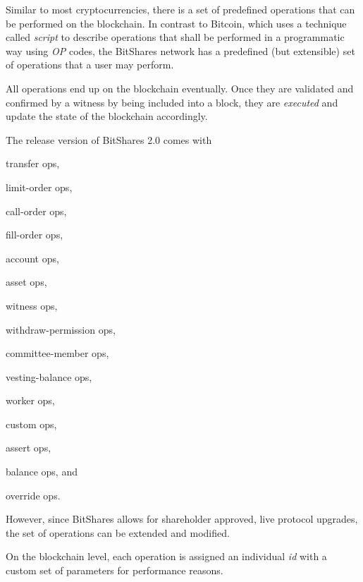 Similar to most cryptocurrencies, there is a set of predefined operations that
can be performed on the blockchain. In contrast to Bitcoin, which uses a
technique called \emph{script} to describe operations that shall be performed
in a programmatic way using \emph{OP} codes, the BitShares network has a
predefined (but extensible) set of operations that a user may perform.

All operations end up on the blockchain eventually. Once they are validated and
confirmed by a witness by being included into a block, they are \emph{executed}
and update the state of the blockchain accordingly.

The release version of BitShares 2.0 comes with 
\begin{inparaenum}[(a)]
 \item transfer ops,
 \item limit-order ops,
 \item call-order ops,
 \item fill-order ops,
 \item account ops,
 \item asset ops,
 \item witness ops,
 \item withdraw-permission ops,
 \item committee-member ops,
 \item vesting-balance ops,
 \item worker ops,
 \item custom ops,
 \item assert ops,
 \item balance ops, and
 \item override ops.
\end{inparaenum}
However, since BitShares allows for shareholder approved, live protocol
upgrades, the set of operations can be extended and modified. 

On the blockchain level, each operation is assigned an individual \emph{id}
with a custom set of parameters for performance reasons.

